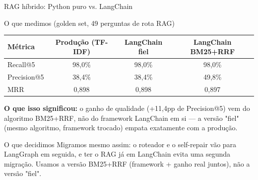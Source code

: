 
\begin{frame}{RAG híbrido: Python puro vs. LangChain}
  \begin{numerobloco}{O que medimos (golden set, 49 perguntas de rota RAG)}
    \begin{center}
    \begin{tabular}{lccc}
      \toprule
      \textbf{Métrica} & \textbf{Produção (TF-IDF)} & \textbf{LangChain fiel} & \textbf{LangChain BM25+RRF} \\
      \midrule
      Recall@5    & 98,0\%  & 98,0\%  & 98,0\%  \\
      Precision@5 & 38,4\%  & 38,4\%  & \alert{49,8\%} \\
      MRR         & 0,898   & 0,898   & 0,897   \\
      \bottomrule
    \end{tabular}
    \end{center}
  \end{numerobloco}

  \pause
  \textbf{O que isso significou:} o ganho de qualidade (+11,4pp de Precision@5) vem do
  \alert{algoritmo} BM25+RRF, não do framework LangChain em si — a versão "fiel" (mesmo
  algoritmo, framework trocado) empata exatamente com a produção.

  \pause
  \begin{decisaobloco}{O que decidimos}
    Migramos mesmo assim: o roteador e o self-repair vão para LangGraph em seguida, e ter o
    RAG já em LangChain evita uma segunda migração. Usamos a versão BM25+RRF (framework +
    ganho real juntos), não a versão "fiel".
  \end{decisaobloco}
\end{frame}
